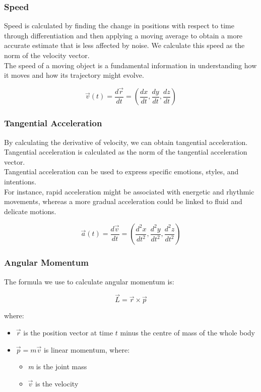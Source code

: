 \subsubsection{Speed}
Speed is calculated by finding the change in positions with respect to time through differentiation and then applying a moving average to obtain a more accurate estimate that is less affected by noise.
We calculate this speed as the norm of the velocity vector. \\
The speed of a moving object is a fundamental information in understanding how it moves and how its trajectory might evolve.

\begin{equation}
  \vec{v}(t) = \frac{d\vec{r}}{dt} = \left(\frac{dx}{dt}, \frac{dy}{dt}, \frac{dz}{dt}\right)
\end{equation}

\subsubsection{Tangential Acceleration}
By calculating the derivative of velocity, we can obtain tangential acceleration.
Tangential acceleration is calculated as the norm of the tangential acceleration vector. \\
Tangential acceleration can be used to express specific emotions, styles, and intentions. \\
For instance, rapid acceleration might be associated with energetic and rhythmic movements, whereas a more gradual acceleration could be linked to fluid and delicate motions.

\begin{equation}
  \vec{a}(t) = \frac{d\vec{v}}{dt} = \left(\frac{d^2x}{dt^2}, \frac{d^2y}{dt^2}, \frac{d^2z}{dt^2}\right)
\end{equation}

\subsubsection{Angular Momentum}
The formula we use to calculate angular momentum is:

\begin{equation}
  \vec{L} = \vec{r} \times \vec{p}
\end{equation}

where:

\begin{itemize}
  \item \(\vec{r}\) is the position vector at time \(t\) minus the centre of mass of the whole body
  \item \(\vec{p} = m \vec{v}\) is linear momentum, where:

\begin{itemize}
  \item \textit{m} is the joint mass
  \item \(\vec{v}\) is the velocity
\end{itemize}

\end{itemize}

